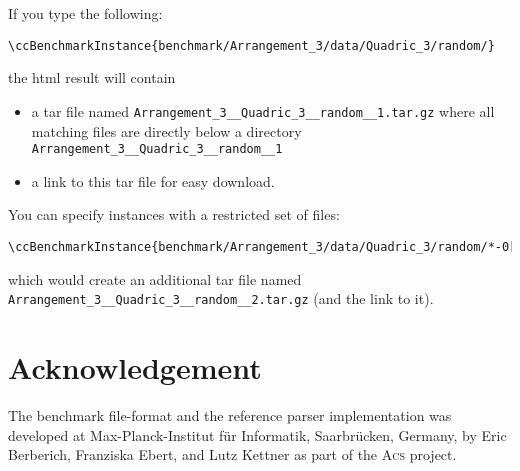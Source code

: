 If you type the following:
\begin{verbatim}
\ccBenchmarkInstance{benchmark/Arrangement_3/data/Quadric_3/random/}
\end{verbatim}

the html result will contain

\begin{itemize}
 \item a tar file named \verb+Arrangement_3__Quadric_3__random__1.tar.gz+ where all matching files are directly below a directory \verb+Arrangement_3__Quadric_3__random__1+
 \item a link to this tar file for easy download.
\end{itemize}


You can specify instances with a restricted set of files:
\begin{verbatim}
\ccBenchmarkInstance{benchmark/Arrangement_3/data/Quadric_3/random/*-0[123].bff}
\end{verbatim}

which would create an additional tar file named \verb+Arrangement_3__Quadric_3__random__2.tar.gz+ (and the link to it).

\section{Acknowledgement}
The benchmark file-format and the reference parser implementation was 
developed at Max-Planck-Institut f\"ur Informatik, Saarbr\"ucken, Germany, by
Eric Berberich, Franziska Ebert, and Lutz Kettner as part of the 
\textsc{Acs} project.
 

